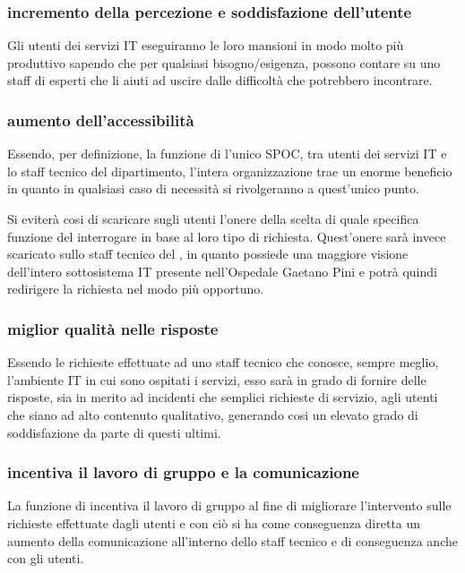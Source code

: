 \subsubsection[Incremento della percezione e soddisfazione dell'utente]{incremento della percezione e soddisfazione dell'utente}
Gli utenti dei servizi \acs{IT} eseguiranno le loro mansioni in modo molto più produttivo sapendo che per qualsiasi bisogno/esigenza, possono contare su uno staff di esperti che li aiuti ad uscire dalle difficoltà che potrebbero incontrare.

\subsubsection[Aumento dell'accessibilità]{aumento dell'accessibilità}
Essendo, per definizione, la funzione di  l'unico \ac{SPOC}, tra utenti dei servizi \acs{IT} e lo staff tecnico del dipartimento, l'intera organizzazione trae un enorme beneficio in quanto in qualsiasi caso di necessità si rivolgeranno a quest'unico punto.

Si eviterà cosi di scaricare sugli utenti l'onere della scelta di quale specifica funzione del  interrogare in base al loro tipo di richiesta. Quest'onere sarà invece scaricato sullo staff tecnico del , in quanto possiede una maggiore visione dell'intero sottosistema \acs{IT} presente nell'Ospedale Gaetano Pini e potrà quindi redirigere la richiesta nel modo più opportuno.

\subsubsection[Miglior qualità nelle risposte]{miglior qualità nelle risposte}
Essendo le richieste effettuate ad uno staff tecnico che conosce, sempre meglio, l'ambiente \acs{IT} in cui sono ospitati i servizi, esso sarà in grado di fornire delle risposte, sia in merito ad incidenti che semplici richieste di servizio, agli utenti che siano ad alto contenuto qualitativo, generando cosi un elevato grado di soddisfazione da parte di questi ultimi.

\subsubsection[Incentiva il lavoro di gruppo e la comunicazione]{incentiva il lavoro di gruppo e la comunicazione}
La funzione di  incentiva il lavoro di gruppo al fine di migliorare l'intervento sulle richieste effettuate dagli utenti e con ciò si ha come conseguenza diretta un aumento della comunicazione all'interno dello staff tecnico e di conseguenza anche con gli utenti.


